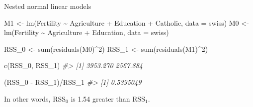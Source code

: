 \documentclass[
  10pt,
  ignorenonframetext,
]{beamer}
\newenvironment{Shaded}{\begin{snugshade}}{\end{snugshade}}
\newcommand{\AttributeTok}[1]{\textcolor[rgb]{0.77,0.63,0.00}{#1}}
\newcommand{\CommentTok}[1]{\textcolor[rgb]{0.56,0.35,0.01}{\textit{#1}}}
\newcommand{\DecValTok}[1]{\textcolor[rgb]{0.00,0.00,0.81}{#1}}
\newcommand{\FunctionTok}[1]{\textcolor[rgb]{0.00,0.00,0.00}{#1}}
\newcommand{\NormalTok}[1]{#1}
\newcommand{\OtherTok}[1]{\textcolor[rgb]{0.56,0.35,0.01}{#1}}
\newcommand{\SpecialCharTok}[1]{\textcolor[rgb]{0.00,0.00,0.00}{#1}}
\begin{document}
\begin{frame}[fragile]{Nested normal linear models}
\protect\hypertarget{nested-normal-linear-models-1}{}
\begin{Shaded}
\begin{Highlighting}[]
\NormalTok{M1 }\OtherTok{\textless{}{-}} \FunctionTok{lm}\NormalTok{(Fertility }\SpecialCharTok{\textasciitilde{}}\NormalTok{ Agriculture }\SpecialCharTok{+}\NormalTok{ Education }\SpecialCharTok{+}\NormalTok{ Catholic, }\AttributeTok{data =}\NormalTok{ swiss)}
\NormalTok{M0 }\OtherTok{\textless{}{-}} \FunctionTok{lm}\NormalTok{(Fertility }\SpecialCharTok{\textasciitilde{}}\NormalTok{ Agriculture }\SpecialCharTok{+}\NormalTok{ Education, }\AttributeTok{data =}\NormalTok{ swiss)}

\NormalTok{RSS\_0 }\OtherTok{\textless{}{-}} \FunctionTok{sum}\NormalTok{(}\FunctionTok{residuals}\NormalTok{(M0)}\SpecialCharTok{\^{}}\DecValTok{2}\NormalTok{)}
\NormalTok{RSS\_1 }\OtherTok{\textless{}{-}} \FunctionTok{sum}\NormalTok{(}\FunctionTok{residuals}\NormalTok{(M1)}\SpecialCharTok{\^{}}\DecValTok{2}\NormalTok{)}

\FunctionTok{c}\NormalTok{(RSS\_0, RSS\_1)}
\CommentTok{\#\textgreater{} [1] 3953.270 2567.884}
\end{Highlighting}
\end{Shaded}

\begin{Shaded}
\begin{Highlighting}[]
\NormalTok{(RSS\_0 }\SpecialCharTok{{-}}\NormalTok{ RSS\_1)}\SpecialCharTok{/}\NormalTok{RSS\_1}
\CommentTok{\#\textgreater{} [1] 0.5395049}
\end{Highlighting}
\end{Shaded}

In other words, \(\text{RSS}_0\) is 1.54 greater than \(\text{RSS}_1\).
\end{frame}
\end{document}
